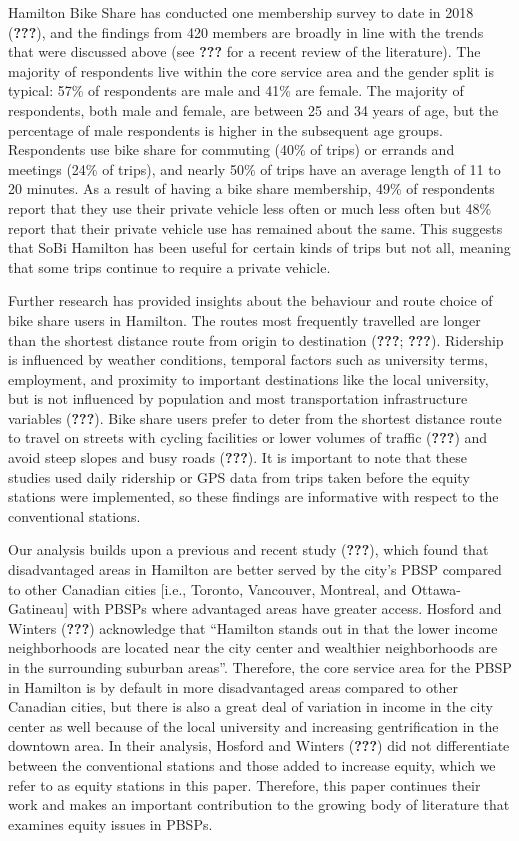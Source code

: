 \documentclass[]{elsarticle} %
\begin{document}
Hamilton Bike Share has conducted one membership survey to date in 2018
({\textbf{???}}), and the findings from 420 members are broadly in line
with the trends that were discussed above (see {\textbf{???}} for a
recent review of the literature). The majority of respondents live
within the core service area and the gender split is typical: 57\% of
respondents are male and 41\% are female. The majority of respondents,
both male and female, are between 25 and 34 years of age, but the
percentage of male respondents is higher in the subsequent age groups.
Respondents use bike share for commuting (40\% of trips) or errands and
meetings (24\% of trips), and nearly 50\% of trips have an average
length of 11 to 20 minutes. As a result of having a bike share
membership, 49\% of respondents report that they use their private
vehicle less often or much less often but 48\% report that their private
vehicle use has remained about the same. This suggests that SoBi
Hamilton has been useful for certain kinds of trips but not all, meaning
that some trips continue to require a private vehicle.

Further research has provided insights about the behaviour and route
choice of bike share users in Hamilton. The routes most frequently
travelled are longer than the shortest distance route from origin to
destination ({\textbf{???}}; {\textbf{???}}). Ridership is influenced by
weather conditions, temporal factors such as university terms,
employment, and proximity to important destinations like the local
university, but is not influenced by population and most transportation
infrastructure variables ({\textbf{???}}). Bike share users prefer to
deter from the shortest distance route to travel on streets with cycling
facilities or lower volumes of traffic ({\textbf{???}}) and avoid steep
slopes and busy roads ({\textbf{???}}). It is important to note that
these studies used daily ridership or GPS data from trips taken before
the equity stations were implemented, so these findings are informative
with respect to the conventional stations.

Our analysis builds upon a previous and recent study ({\textbf{???}}),
which found that disadvantaged areas in Hamilton are better served by
the city's PBSP compared to other Canadian cities {[}i.e., Toronto,
Vancouver, Montreal, and Ottawa-Gatineau{]} with PBSPs where advantaged
areas have greater access. Hosford and Winters ({\textbf{???}})
acknowledge that ``Hamilton stands out in that the lower income
neighborhoods are located near the city center and wealthier
neighborhoods are in the surrounding suburban areas''. Therefore, the
core service area for the PBSP in Hamilton is by default in more
disadvantaged areas compared to other Canadian cities, but there is also
a great deal of variation in income in the city center as well because
of the local university and increasing gentrification in the downtown
area. In their analysis, Hosford and Winters ({\textbf{???}}) did not
differentiate between the conventional stations and those added to
increase equity, which we refer to as equity stations in this paper.
Therefore, this paper continues their work and makes an important
contribution to the growing body of literature that examines equity
issues in PBSPs.
\end{document}

